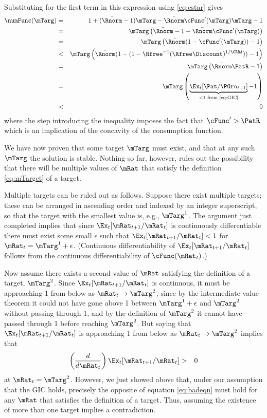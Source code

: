 \documentclass[titlepage]{\econtex}\providecommand{\texname}{BufferStockTheory}%
\begin{document}
{Substituting for the first term in this expression using
\eqref{eq:cstar} gives
\begin{eqnarray*}
\numFunc(\mTarg) & = & 1+(\bar{\Rnorm}-1)\mTarg- \bar{\Rnorm}\cFunc^{\prime}(\mTarg)\mTarg - 1 \\
& = & \mTarg\left(\bar{\Rnorm}-1-\bar{\Rnorm}\cFunc^{\prime}(\mTarg)\right) \\
& = & \mTarg\left(\bar{\Rnorm}(1-\cFunc^{\prime}(\mTarg))-1\right) \\
& < & \mTarg\left(\bar{\Rnorm}(1-(1-{\Rfree}^{-1}(\Rfree\Discount)^{1/%
\CRRA}))-1\right) \\
& = & \mTarg\left(\bar{\Rnorm}\PatR-1%
\right) \\
& = & \mTarg\left(\underbrace{\Ex_{t}[{\Pat}/{\PGro}_{t+1}]}_{<
1\text{~from \eqref{eq:GIC}}}-1\right) \\
& < & 0
\end{eqnarray*}
where the step introducing the inequality imposes the fact that $\cFunc^{\prime} > \PatR$ which is an
implication of the concavity of the consumption function.

We have now proven that some target $\mTarg$ must exist, and that at any such
$\mTarg$ the solution is stable. Nothing so far, however, rules
out the possibility that there will be multiple values of $\mRat$ that
satisfy the definition \eqref{eq:mTarget} of a target.

Multiple targets can be ruled out as follows. Suppose there exist
multiple targets; these can be arranged in ascending order and indexed
by an integer superscript, so that the target with the smallest value is,
e.g., $\mTarg^{1}$. The argument just completed implies that since
$\Ex_{t}[{\mRat}_{t+1}/\mRat_{t}]$ is continuously differentiable
there must exist some small $\epsilon$ such that
$\Ex_{t}[{\mRat}_{t+1}/\mRat_{t}] < 1$ for $\mRat_{t} =
\mTarg^{1}+\epsilon$. (Continuous differentiability of
$\Ex_{t}[{\mRat}_{t+1}/\mRat_{t}]$ follows from the continuous
differentiability of $\cFunc(\mRat_{t})$.) 

Now assume there exists a second value of $\mRat$ satisfying the
definition of a target, $\mTarg^{2}$. Since
$\Ex_{t}[{\mRat}_{t+1}/\mRat_{t}]$ is continuous, it must be
approaching 1 from below as $\mRat_{t} \rightarrow \mTarg^{2}$, since
by the intermediate value theorem it could not have gone above 1
between $\mTarg^{1}+\epsilon$ and $\mTarg^{2}$ without passing through
1, and by the definition of $\mTarg^{2}$ it cannot have passed through
1 before reaching $\mTarg^{2}$.  But saying that
$\Ex_{t}[{\mRat}_{t+1}/\mRat_{t}]$ is approaching 1 from below as
$\mRat_{t} \rightarrow \mTarg^{2}$ implies that
\begin{eqnarray}
\left(\frac{d}{d\mRat_{t}}\right)\Ex_{t}[{\mRat}_{t+1}/\mRat_{t}] & > & 0
\label{eq:badeqn}
\end{eqnarray}
at $\mRat_{t}=\mTarg^{2}$. However, we just showed above that, under
our assumption that the GIC holds, precisely the opposite of equation
\eqref{eq:badeqn} must hold for any $\mRat$ that satisfies the definition
of a target. Thus, assuming the existence of more than one target
implies a contradiction.

}
\end{document}
